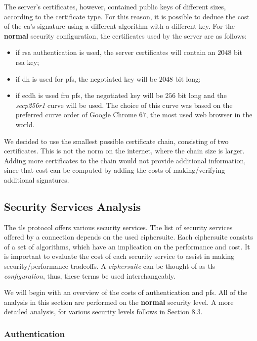 \documentclass{llncs}
\begin{document}
The server's certificates, however, contained public keys of different sizes, according to the certificate type.
For this reason, it is possible to deduce the cost of the \gls{ca}'s signature using a different algorithm with a
different key. For the \textbf{normal} security configuration, the certificates used by the server are as follows:

\begin{itemize}
  \item if \gls{rsa} authentication is used, the server certificates will contain an $2048$ bit \gls{rsa} key;
  \item if \gls{dh} is used for \gls{pfs}, the negotiated key will be $2048$ bit long;
  \item if \gls{ecdh} is used fro \gls{pfs}, the negotiated key will be $256$ bit long and the \textit{secp256r1}
  curve will be used. The choice of this curve was based on the preferred curve order of Google Chrome $67$, the most
  used web browser in the world\cite{BrowserS4:online}.
\end{itemize}

We decided to use the smallest possible certificate chain, consisting of two certificates. This is not the norm
on the internet, where the chain size is larger. Adding more certificates to the chain would not provide additional
information, since that cost can be computed by adding the costs of making/verifying additional signatures.

\subsection{Security Services Analysis}

The \gls{tls} protocol offers various security services. The list of security services offered by a connection
depends on the used ciphersuite. Each ciphersuite consists of a set of algorithms, which have an implication 
on the performance and cost. It is important to evaluate the cost of each security service to assist in making
security/performance tradeoffs. A \textit{ciphersuite} can be thought of as \gls{tls} \textit{configuration},
thus, these terms be used interchangeably.

We will begin with an overview of the costs of authentication and \gls{pfs}. All of the analysis in this section
are performed on the \textbf{normal} security level. A more detailed analysis, for various security levels
follows in Section 8.3.

\subsubsection{Authentication}
\end{document}

